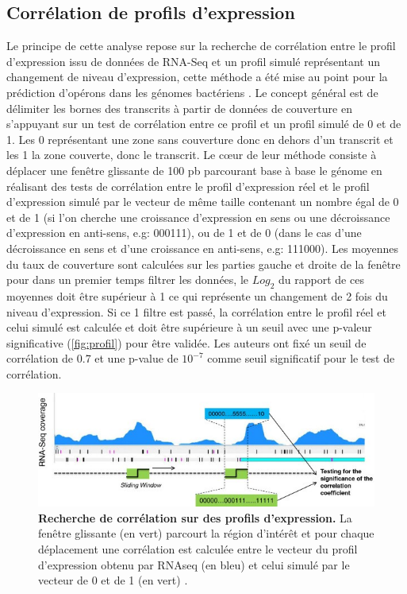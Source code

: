 \documentclass[12pt,a4paper]{report}
\begin{document}
\begin{onehalfspace}
\subsection*{Corrélation de profils d'expression}
\label{methode_correlation}
Le principe de cette analyse repose sur la recherche de corrélation entre le profil d'expression issu de données de RNA-Seq et un profil simulé représentant un changement de niveau d'expression, cette méthode a été mise au point pour la prédiction d'opérons dans les génomes bactériens \citep{Fortino2014}. Le concept général est de délimiter les bornes des transcrits à partir de données de couverture en s'appuyant sur un test de corrélation entre ce profil et un profil simulé de 0 et de 1. Les 0 représentant une zone sans couverture donc en dehors d'un transcrit et les 1 la zone couverte, donc le transcrit. Le cœur de leur méthode consiste à déplacer une fenêtre glissante de 100 pb parcourant base à base le génome en réalisant des tests de corrélation entre le profil d'expression réel et le profil d'expression simulé par le vecteur de même taille contenant un nombre égal de 0 et de 1 (si l'on cherche une croissance d'expression en sens ou une décroissance d'expression en anti-sens, e.g: 000111), ou de 1 et de 0 (dans le cas d'une décroissance en sens et d'une croissance en anti-sens, e.g: 111000). Les moyennes du taux de couverture sont calculées sur les parties gauche et droite de la fenêtre pour dans un premier temps filtrer les données, le $Log_2$ du rapport de ces moyennes doit être supérieur à 1 ce qui représente un changement de 2 fois du niveau d'expression. Si ce 1 filtre est passé, la corrélation entre le profil réel et celui simulé est calculée et doit être supérieure à un seuil avec une p-valeur significative (\autoref{fig:profil}) pour être validée. Les auteurs ont fixé un seuil de corrélation de 0.7 et une p-value de $10^{-7}$ comme seuil significatif pour le test de corrélation.

\begin{figure}[ht]
\centerline{\includegraphics[scale=0.6]{figures/profil.jpg}}
\caption{\textbf{Recherche de corrélation sur des profils d'expression.} La fenêtre glissante (en vert) parcourt la région d'intérêt et pour chaque déplacement une corrélation est calculée entre le vecteur du profil d'expression obtenu par RNAseq (en bleu) et celui simulé par le vecteur de 0 et de 1 (en vert) \citep{Fortino2014}.}
\label{fig:profil} 
\end{figure}


\end{onehalfspace}
\end{document}
